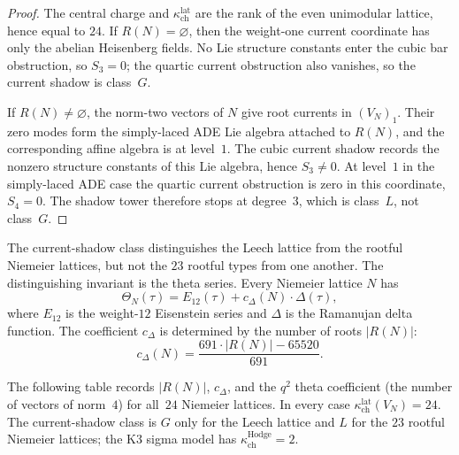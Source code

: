 \begin{proof}
The central charge and \(\kappa_{\mathrm{ch}}^{\mathrm{lat}}\) are the
rank of the even unimodular lattice, hence equal to \(24\). If
\(R(N)=\varnothing\), then the weight-one current coordinate has only the
abelian Heisenberg fields. No Lie structure constants enter the cubic bar
obstruction, so \(S_3=0\); the quartic current obstruction also vanishes,
so the current shadow is class~\(G\).

If \(R(N)\neq\varnothing\), the norm-two vectors of \(N\) give root
currents in \((V_N)_1\). Their zero modes form the simply-laced ADE Lie
algebra attached to \(R(N)\), and the corresponding affine algebra is at
level~\(1\). The cubic current shadow records the nonzero structure
constants of this Lie algebra, hence \(S_3\neq0\). At level~\(1\) in the
simply-laced ADE case the quartic current obstruction is zero in this
coordinate, \(S_4=0\). The shadow tower therefore stops at degree~\(3\),
which is class~\(L\), not class~\(G\).
\end{proof}

\begin{remark}
\label{rem:niemeier-theta-distinguishing}
The current-shadow class distinguishes the Leech lattice from the
rootful Niemeier lattices, but not the \(23\) rootful types from one
another. The distinguishing invariant is the theta series. Every Niemeier lattice
$N$ has
\[
 \Theta_N(\tau) = E_{12}(\tau) + c_\Delta(N) \cdot \Delta(\tau),
\]
where $E_{12}$ is the weight-$12$ Eisenstein series and $\Delta$ is the
Ramanujan delta function. The coefficient $c_\Delta$ is determined by
the number of roots $|R(N)|$:
\[
 c_\Delta(N) = \frac{691 \cdot |R(N)| - 65520}{691}.
\]
\end{remark}

The following table records $|R(N)|$, $c_\Delta$, and the $q^2$ theta
coefficient (the number of vectors of norm~$4$) for all~$24$
Niemeier lattices. In every case
\(\kappa_{\mathrm{ch}}^{\mathrm{lat}}(V_N)=24\). The current-shadow class is
\(G\) only for the Leech lattice and \(L\) for the \(23\) rootful
Niemeier lattices; the K3 sigma model has
\(\kappa_{\mathrm{ch}}^{\mathrm{Hodge}} = 2\).

